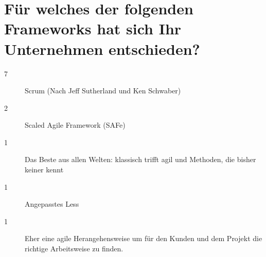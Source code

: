 \section*{Für welches der folgenden Frameworks hat sich Ihr Unternehmen entschieden?}
\begin{description}
    \item[7 \responsecount] Scrum (Nach Jeff Sutherland und Ken Schwaber)
    \item[2 \responsecount] Scaled Agile Framework (SAFe)
    \item[1 \responsecount] Das Beste aus allen Welten: klassisch trifft agil und Methoden, die bisher keiner kennt
    \item[1 \responsecount] Angepasstes Less
    \item[1 \responsecount] Eher eine agile Herangehensweise um für den Kunden und dem Projekt die richtige Arbeitsweise zu finden.
\end{description}

